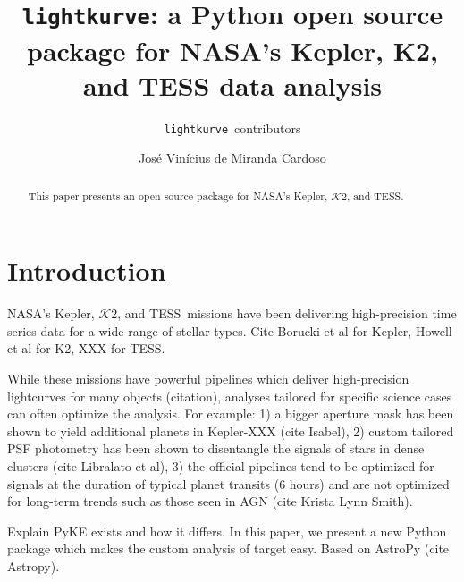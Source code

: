 \documentclass[twocolumn]{aastex62}
\newcommand{\KTWO}{$\mathcal{K}\mathit{2}$}
\newcommand{\tess}{TESS}
\newcommand{\lightkurve}{\texttt{lightkurve}}
\begin{document}
\title{\lightkurve: a Python open source package for NASA's Kepler, K2, and TESS data analysis}


\author{\lightkurve~contributors}

\author{Jos\'e Vin\'icius de Miranda Cardoso}

\begin{abstract}

    This paper presents an open source package for NASA's Kepler, \KTWO, and
    TESS.

\end{abstract}


\section{Introduction} \label{sec:intro}
NASA's Kepler, \KTWO, and \tess~missions have been delivering high-precision time
series data for a wide range of stellar types.
Cite Borucki et al for Kepler, Howell et al for K2, XXX for TESS.

While these missions have powerful pipelines which deliver high-precision
lightcurves for many objects (citation), analyses tailored for specific
science cases can often optimize the analysis.
For example:
1) a bigger aperture mask has been shown to yield additional planets in Kepler-XXX (cite Isabel),
2) custom tailored PSF photometry has been shown to disentangle the signals of stars in
dense clusters (cite Libralato et al),
3) the official pipelines tend to be optimized for signals at the duration of typical
planet transits (6 hours) and are not optimized for long-term trends such as those
seen in AGN (cite Krista Lynn Smith).

Explain PyKE exists and how it differs.
In this paper, we present a new Python package which makes the custom analysis
of target easy.  Based on AstroPy (cite Astropy).
\end{document}
